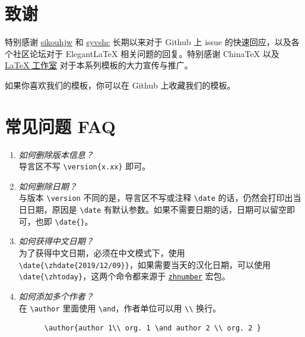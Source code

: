 \documentclass[cn,hazy,blue,14pt,screen]{elegantnote}
\begin{document}
\section{致谢}

特别感谢 \href{https://github.com/sikouhjw}{sikouhjw} 和 \href{https://github.com/syvshc}{syvshc}  长期以来对于 Github 上 issue 的快速回应，以及各个社区论坛对于 ElegantLaTeX 相关问题的回复。特别感谢 ChinaTeX 以及 \href{http://www.latexstudio.net/}{LaTeX 工作室} 对于本系列模板的大力宣传与推广。

如果你喜欢我们的模板，你可以在 Github 上收藏我们的模板。

\section{常见问题 FAQ}

\begin{enumerate}[label=\arabic*).]
  \item \textit{如何删除版本信息？}\\
    导言区不写 \lstinline|\version{x.xx}| 即可。
  \item \textit{如何删除日期？}\\
    与版本 \lstinline{\version} 不同的是，导言区不写或注释 \lstinline{\date} 的话，仍然会打印出当日日期，原因是 \lstinline{\date} 有默认参数。如果不需要日期的话，日期可以留空即可，也即 \lstinline|\date{}|。
  \item \textit{如何获得中文日期？}\\
    为了获得中文日期，必须在中文模式下，使用 \lstinline|\date{\zhdate{2019/12/09}}|，如果需要当天的汉化日期，可以使用 \lstinline|\date{\zhtoday}|，这两个命令都来源于 \href{https://ctan.org/pkg/zhnumber}{\lstinline{zhnumber}} 宏包。
  \item \textit{如何添加多个作者？}\\
    在 \lstinline{\author} 里面使用 \lstinline{\and}，作者单位可以用 \lstinline{\\} 换行。
    \begin{lstlisting}
      \author{author 1\\ org. 1 \and author 2 \\ org. 2 }
    \end{lstlisting}
\end{enumerate}

\nocite{*}
\printbibliography[heading=bibintoc, title=\ebibname]
\end{document}
